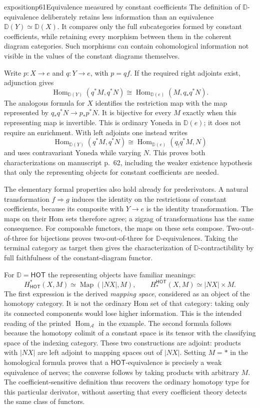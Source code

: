 \begin{dcomment}{exposition}{p61}{Equivalence measured by constant coefficients}
The definition of $\mathbb D$-equivalence deliberately retains less information than an equivalence $\mathbb D(Y)\simeq\mathbb D(X)$. It compares only the full subcategories formed by constant coefficients, while retaining every morphism between them in the coherent diagram categories. Such morphisms can contain cohomological information not visible in the values of the constant diagrams themselves.

Write $p:X\to e$ and $q:Y\to e$, with $p=qf$. If the required right adjoints exist, adjunction gives
\[
 \operatorname{Hom}_{\mathbb D(Y)}(q^*M,q^*N)
 \cong\operatorname{Hom}_{\mathbb D(e)}(M,q_*q^*N).
\]
The analogous formula for $X$ identifies the restriction map with the map represented by $q_*q^*N\to p_*p^*N$. It is bijective for every $M$ exactly when this representing map is invertible. This is ordinary Yoneda in $\mathbb D(e)$; it does not require an enrichment. With left adjoints one instead writes
\[
 \operatorname{Hom}_{\mathbb D(Y)}(q^*M,q^*N)
 \cong\operatorname{Hom}_{\mathbb D(e)}(q_!q^*M,N)
\]
and uses contravariant Yoneda while varying $N$. This proves both characterizations on manuscript p.~62, including the weaker existence hypothesis that only the representing objects for constant coefficients are needed.

The elementary formal properties also hold already for prederivators. A natural transformation $f\Rightarrow g$ induces the identity on the restrictions of constant coefficients, because its composite with $Y\to e$ is the identity transformation. The maps on their Hom sets therefore agree; a zigzag of transformations has the same consequence. For composable functors, the maps on these sets compose. Two-out-of-three for bijections proves two-out-of-three for $\mathbb D$-equivalences. Taking the terminal category as target then gives the characterization of $\mathbb D$-contractibility by full faithfulness of the constant-diagram functor.

For $\mathbb D=\mathsf{HOT}$ the representing objects have familiar meanings:
\[
 H^*_{\mathsf{HOT}}(X,M)\simeq
 \operatorname{Map}(|NX|,M),
 \qquad
 H_*^{\mathsf{HOT}}(X,M)\simeq |NX|\times M.
\]
The first expression is the derived \emph{mapping space}, considered as an object of the homotopy category. It is not the ordinary Hom set of that category: taking only its connected components would lose higher information. This is the intended reading of the printed $\operatorname{Hom}_{\mathcal A}$ in the example. The second formula follows because the homotopy colimit of a constant space is its tensor with the classifying space of the indexing category. These two constructions are adjoint: products with $|NX|$ are left adjoint to mapping spaces out of $|NX|$. Setting $M=*$ in the homological formula proves that a $\mathsf{HOT}$-equivalence is precisely a weak equivalence of nerves; the converse follows by taking products with arbitrary $M$. The coefficient-sensitive definition thus recovers the ordinary homotopy type for this particular derivator, without asserting that every coefficient theory detects the same class of functors.
\end{dcomment}

